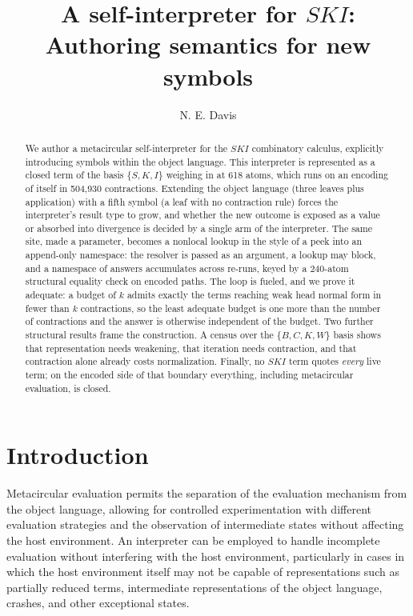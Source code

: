 \documentclass[review]{jfp-epi}
\title[A self-interpreter for SKI]{A self-interpreter for $SKI$:\\
  Authoring semantics for new symbols}
\author{N. E. Davis}
\affiliation{%
  \institution{ZeroAttest}
  \city{Champaign, Illinois}
  \country{United States of America}
  \authoremail{neal.davis@protonmail.com}
}
\begin{document}
\begin{abstract}
We author a metacircular self-interpreter for the $SKI$ combinatory
calculus, explicitly introducing symbols within the object
language.  This interpreter is represented as a closed term of the
basis $\{S, K, I\}$ weighing in at 618 atoms, which runs on an encoding
of itself in 504,930 contractions. Extending the object language (three
leaves plus application) with a fifth symbol (a leaf with no
contraction rule) forces the interpreter's result
type to grow, and whether the new outcome is exposed as a value or
absorbed into divergence is decided by a single arm of the interpreter.
The same site, made a parameter, becomes a nonlocal lookup in the style
of a peek into an append-only namespace: the resolver is passed as an
argument, a lookup may block, and a namespace of answers accumulates
across re-runs, keyed by a 240-atom structural equality check on encoded
paths. The loop is fueled, and we prove it adequate: a budget of $k$
admits exactly the terms reaching weak head normal form in fewer than
$k$ contractions, so the least adequate budget is one more than the
number of contractions and the answer is otherwise independent of the
budget. Two further structural results frame the construction. A census over the
$\{B, C, K, W\}$ basis shows that representation needs weakening, that
iteration needs contraction, and that contraction alone already costs
normalization. Finally, no $SKI$ term quotes \emph{every} live term; on the encoded
side of that boundary everything, including metacircular evaluation, is
closed.
\end{abstract}

\maketitle

\section{Introduction}\label{sec:intro}

Metacircular evaluation permits the separation of the evaluation
mechanism from the object language, allowing for controlled
experimentation with different evaluation strategies and the observation
of intermediate states without affecting the host environment.  An
interpreter can be employed to handle incomplete evaluation without
interfering with the host environment, particularly in cases in which
the host environment itself may not be capable of representations such
as partially reduced terms, intermediate representations of the object
language, crashes, and other exceptional states.
\end{document}
